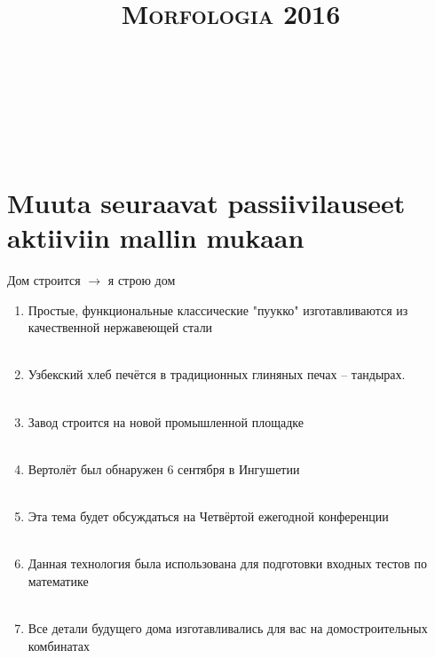 \documentclass[paper=a4, fontsize=11pt]{scrartcl}
\title{	
\normalfont \normalsize 
\textsc{Morfologia 2016} \\ [25pt] 
\horrule{0.5pt} \\[0.4cm] 
\huge  \\ 
\horrule{2pt} \\[0.5cm] 
}
\date{}
\begin{document}
\onehalfspacing

\section{Muuta seuraavat passiivilauseet aktiiviin mallin mukaan}

Дом строится $\rightarrow$ я строю дом

\begin{enumerate}
    \item Простые, функциональные классические "пуукко" изготавливаются из качественной нержавеющей стали \\
            \underline{\hspace{14cm}} \\
    \item Узбекский хлеб печётся в традиционных глиняных печах -- тандырах. \\
            \underline{\hspace{14cm}} \\
    \item Завод строится на новой промышленной площадке \\
            \underline{\hspace{14cm}} \\
    \item Вертолёт был обнаружен 6 сентября в Ингушетии \\
            \underline{\hspace{14cm}} \\
    \item Эта тема будет обсуждаться на Четвёртой ежегодной конференции \\
            \underline{\hspace{14cm}} \\
    \item Данная технология была использована для подготовки входных тестов по математике \\
            \underline{\hspace{14cm}} \\
    \item Все детали будущего дома изготавливались для вас на домостроительных комбинатах \\
            \underline{\hspace{14cm}} \\
\end{enumerate}
\end{document}
